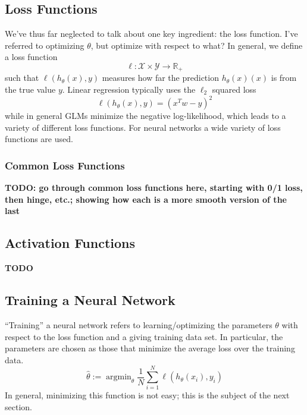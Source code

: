 \documentclass[12pt]{article}
\newcommand{\R}{\mathcal{R}}
\DeclareMathOperator*{\argmin}{argmin}
\def\R{\mathbb{R}}
\begin{document}
\subsection{Loss Functions}
We've thus far neglected to talk about one key ingredient: the loss function. I've referred to optimizing $\theta$, but optimize with respect to what? In general, we define a loss function
\[\ell: \mathcal{X} \times \mathcal{Y} \to \R_+\]
such that $\ell(h_\theta(x), y)$ measures how far the prediction $h_\theta(x)(x)$ is from the true value $y$. Linear regression typically uses the $\ell_2$ squared loss
\[\ell(h_\theta(x), y) = (x^T w - y)^2\]
while in general GLMs minimize the negative log-likelihood, which leads to a variety of different loss functions. For neural networks a wide variety of loss functions are used. 

\subsubsection{Common Loss Functions}
\textbf{TODO: go through common loss functions here, starting with 0/1 loss, then hinge, etc.; showing how each is a more smooth version of the last}

\subsection{Activation Functions}
\textbf{TODO}

\subsection{Training a Neural Network}
``Training'' a neural network refers to learning/optimizing the parameters $\theta$ with respect to the loss function and a giving training data set. In particular, the parameters are chosen 
as those that minimize the average loss over the training data. 
\[\hat{\theta} := \argmin_{\theta} \frac{1}{N} \sum_{i = 1}^{N} \ell(h_\theta(x_i), y_i)\]
In general, minimizing this function is not easy; this is the subject of the next section. 

\end{document}
